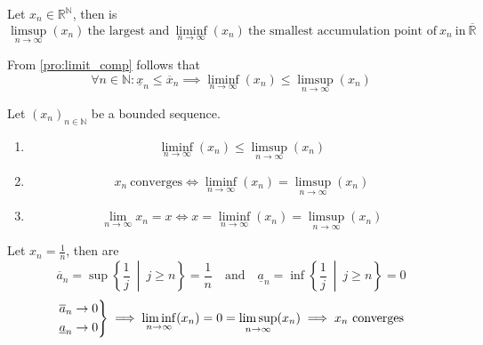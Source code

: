 \begin{theorem}
   Let \(x_n \in \mathbb{R}^\mathbb{N}\), then is
   \[\limsup_{n \to \infty}(x_n)~\text{the largest and}~\liminf_{n \to \infty}(x_n)~\text{the smallest accumulation point of}~x_n~\text{in}~\overline{\mathbb{R}}\]
\end{theorem}

From \cref{pro:limit_comp} follows that
\[\forall n \in \mathbb{N}: \underline{x}_n \leq \overline{x}_n \implies \liminf_{n \to \infty}(x_n) \leq \limsup_{n \to \infty}(x_n)\]

\begin{theorem}[\(\liminf = \limsup \iff (x_n)\) convergent]\label{thm:limsup_inf_rules}
   Let \((x_n)_{n \in \mathbb{N}}\) be a bounded sequence.
   \begin{enumerate}[label=\roman*, align=Center]
      \item \[\liminf_{n \to \infty}(x_n) \leq \limsup_{n \to \infty}(x_n)\]
      \item \[x_n~\text{converges} \iff \liminf_{n \to \infty}(x_n) = \limsup_{n \to \infty}(x_n)\]
         \item \[\lim_{n \to \infty} x_n = x \iff x = \liminf_{n \to \infty}(x_n) = \limsup_{n \to \infty}(x_n)\]
   \end{enumerate}
\end{theorem}
\begin{example}
   Let \(x_n = \frac{1}{n}\), then are
   \[\overline{a}_n = \sup\left\{\frac{1}{j}~\middle|~j \geq n\right\} = \frac{1}{n} \quad\text{and}\quad \underline{a}_n = \inf\left\{\frac{1}{j}~\middle|~j \geq n\right\} = 0\]
   \[\begin{drcases}
      \overline{a}_n \to 0\\
      \underline{a}_n \to 0
   \end{drcases} \implies \liminf_{n \to \infty}(x_n) = 0 = \limsup_{n \to \infty}(x_n) \implies x_n~\text{converges}\]
\end{example}

\newpage

